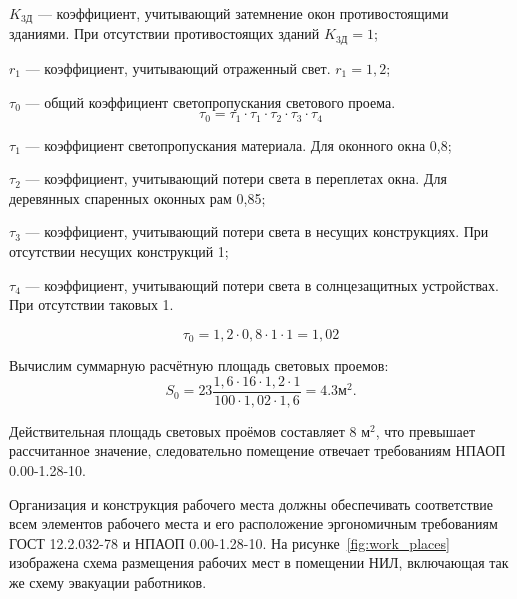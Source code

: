 $K_\text{3Д}$ --- коэффициент, учитывающий затемнение окон противостоящими
зданиями.  При отсутствии противостоящих зданий $K_\text{3Д} = 1$;

$r_1$ --- коэффициент, учитывающий отраженный свет. $r_1 = 1,2$;

$\tau_0$ --- общий коэффициент светопропускания светового проема.
\begin{equation}\tau_0 = \tau_1 \cdot \tau_1 \cdot \tau_2 \cdot \tau_3 \cdot \tau_4\end{equation}

$\tau_1$ --- коэффициент светопропускания материала. Для оконного окна 0,8;

$\tau_2$ --- коэффициент, учитывающий потери света в переплетах окна. Для деревянных спаренных оконных рам 0,85;

$\tau_3$ --- коэффициент, учитывающий потери света в несущих конструкциях. При отсутствии несущих конструкций 1;

$\tau_4$ --- коэффициент, учитывающий потери света в солнцезащитных устройствах. При отсутствии таковых 1.

\begin{equation}\tau_0 = 1,2 \cdot 0,8 \cdot 1 \cdot 1 = 1,02\end{equation}

Вычислим суммарную расчётную площадь световых проемов:
\begin{equation}S_0 = 23 \frac{1,6 \cdot 16 \cdot 1,2 \cdot 1}{100 \cdot 1,02 \cdot 1,6} = 4.3 \text{м}^2.\end{equation}

Действительная площадь световых проёмов составляет 8 $\text{м}^2$, что превышает
рассчитанное значение, следовательно помещение отвечает требованиям НПАОП
0.00-1.28-10.

Организация и конструкция рабочего места должны обеспечивать соответствие всем
элементов рабочего места и его расположение эргономичным требованиям ГОСТ
12.2.032-78 и НПАОП 0.00-1.28-10. На рисунке~\ref{fig:work_places} изображена
схема размещения рабочих мест в помещении НИЛ, включающая так же схему эвакуации
работников.

